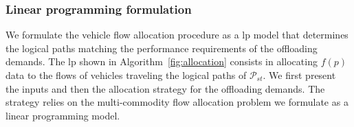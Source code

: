 \subsubsection{Linear programming formulation} 

We formulate the vehicle flow allocation procedure as a \acrfull{lp} model that determines the logical paths matching the performance requirements of the offloading demands. The \acrshort{lp} shown in Algorithm~\ref{fig:allocation} consists in allocating $f(p)$ data to the flows of vehicles traveling the logical paths of $\mathcal{P}_{st}$. We first present the inputs and then the allocation strategy for the offloading demands. The strategy relies on the multi-commodity flow allocation problem we formulate as a linear programming model. 

